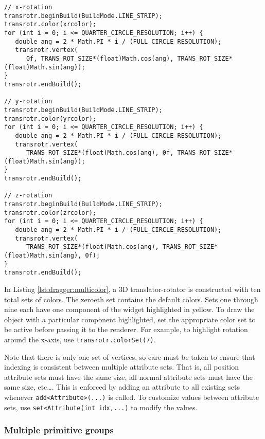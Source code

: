 \documentclass{article}
\begin{document}
\begin{lstlisting}[caption={3D Transform dragger with multiple color sets},label=lst:dragger:multicolor]
// x-rotation
transrotr.beginBuild(BuildMode.LINE_STRIP);
transrotr.color(xrcolor);
for (int i = 0; i <= QUARTER_CIRCLE_RESOLUTION; i++) {
   double ang = 2 * Math.PI * i / (FULL_CIRCLE_RESOLUTION);
   transrotr.vertex(
      0f, TRANS_ROT_SIZE*(float)Math.cos(ang), TRANS_ROT_SIZE*(float)Math.sin(ang));
}
transrotr.endBuild();
      
// y-rotation
transrotr.beginBuild(BuildMode.LINE_STRIP);
transrotr.color(yrcolor);
for (int i = 0; i <= QUARTER_CIRCLE_RESOLUTION; i++) {
   double ang = 2 * Math.PI * i / (FULL_CIRCLE_RESOLUTION);
   transrotr.vertex(
      TRANS_ROT_SIZE*(float)Math.cos(ang), 0f, TRANS_ROT_SIZE*(float)Math.sin(ang));
}
transrotr.endBuild();
      
// z-rotation
transrotr.beginBuild(BuildMode.LINE_STRIP);
transrotr.color(zrcolor);
for (int i = 0; i <= QUARTER_CIRCLE_RESOLUTION; i++) {
   double ang = 2 * Math.PI * i / (FULL_CIRCLE_RESOLUTION);
   transrotr.vertex( 
      TRANS_ROT_SIZE*(float)Math.cos(ang), TRANS_ROT_SIZE*(float)Math.sin(ang), 0f);
}
transrotr.endBuild();
\end{lstlisting}

In Listing \ref{lst:dragger:multicolor}, a 3D translator-rotator is constructed with ten
total sets of colors.  The zeroeth set contains the default colors.  Sets one through
nine each have one component of the widget highlighted in yellow.  To draw the object
with a particular component highlighted, set the appropriate color set to be active
before passing it to the renderer.  For example, to highlight rotation around the
x-axis, use \lstinline{transrotr.colorSet(7)}.

Note that there is only one set of vertices, so care must be taken to ensure
that indexing is consistent between multiple attribute sets.  That is, all position
attribute sets must have the same size, all normal attribute sets must have the same
size, etc\ldots.  This is enforced by adding an attribute to all existing sets whenever 
\lstinline{add<Attribute>(...)} is called.  To customize values between attribute
sets, use \lstinline{set<Attribute(int idx,...)} to modify the values.

\subsubsection{Multiple primitive groups}
\end{document}

